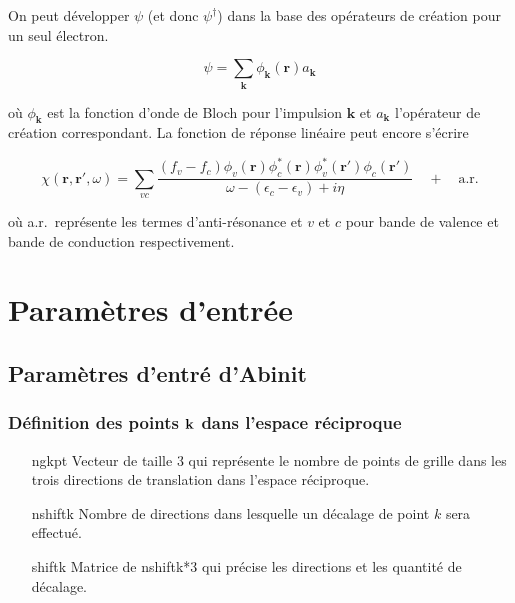On peut développer $\psi$ (et donc $\psi^\dagger$) dans la base des opérateurs de création
pour un seul électron.

$$
\psi = \sum_\textbf{k} \phi_\textbf{k}(\textbf{r}) a_\textbf{k}
$$

où $\phi_\textbf{k}$ est la fonction d'onde de Bloch pour l'impulsion $\textbf{k}$ et $a_\textbf{k}$ l'opérateur de création correspondant. La fonction de réponse linéaire peut encore s'écrire

\begin{equation}\label{chi}
  \chi(\textbf{r}, \textbf{r}', \omega) = \sum_{vc} \frac{(f_v - f_c)\phi_v(\textbf{r}) \phi_c^*(\textbf{r}) \phi_v^*(\textbf{r}') \phi_c(\textbf{r}')}{\omega - (\epsilon_c - \epsilon_v) + i\eta} \quad + \quad \text{a.r.}
\end{equation}

où a.r.\ représente les termes d'anti-résonance et $v$ et $c$ pour bande de valence et bande de conduction respectivement.

\chapter{Paramètres d'entrée}
\section{Paramètres d'entré d'Abinit}
\subsection{Définition des points $\vb{k}$ dans l'espace réciproque}
\begin{itemize}[labelwidth=, leftmargin=+, font=\bfseries]
  \item[ngkpt] Vecteur de taille 3 qui représente le nombre de points de grille dans les trois directions de translation dans l'espace réciproque.
  \item[nshiftk] Nombre de directions dans lesquelle un décalage de point $k$ sera effectué.
  \item[shiftk] Matrice de nshiftk*3 qui précise les directions et les quantité de décalage.
\end{itemize}
